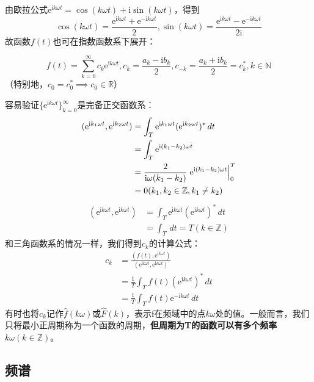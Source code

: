 由欧拉公式$\mathrm{e}^{\mathrm{i}k\omega t}=\cos(k\omega t)+\mathrm{i}\sin(k\omega t)$，得到
\[\cos(k\omega t)=\frac{\mathrm{e}^{\mathrm{i}k\omega t}+\mathrm{e}^{-\mathrm{i}k\omega t}}{2},\sin(k\omega t)=\frac{\mathrm{e}^{\mathrm{i}k\omega t}-\mathrm{e}^{-\mathrm{i}k\omega t}}{2\mathrm{i}}\]
故函数$f(t)$也可在指数函数系下展开：\begin{definition}[指数形式傅里叶展开]
    \[f(t)=\sum_{k = 0}^{\infty}  c_k \mathrm{e}^{\mathrm{i}k\omega t} ,c_k=\frac{a_k-\mathrm{i}b_k}{2},c_{-k}=\frac{a_k+\mathrm{i}b_k}{2}=c_k^*,k\in \mathbb{N}\]
（特别地，$c_0=c_0^*\implies c_0\in\mathbb{R} $）
\end{definition}
容易验证$\{\mathrm{e}^{\mathrm{i}k\omega t}\}_{k=0}^{\infty}$是完备正交函数系：
\begin{align*}
    (\mathrm{e}^{\mathrm{i}k_1\omega t},\mathrm{e}^{\mathrm{i}k_2\omega t})&=\int_{T}\mathrm{e}^{\mathrm{i}k_1\omega t}(\mathrm{e}^{\mathrm{i}k_2\omega t})^*\,dt\\
    &=\int_{T}\mathrm{e}^{\mathrm{i}(k_1-k_2)\omega t}\\
    &=\frac{2}{\mathrm{i}\omega (k_1-k_2)}\left.\mathrm{e}^{\mathrm{i}(k_1-k_2)\omega t}\right|_{0}^{T}\\
    &=0(k_1,k_2\in \mathbb{Z},k_1\neq k_2)
\end{align*}
\begin{align*}
    (\mathrm{e}^{\mathrm{i}k\omega t},\mathrm{e}^{\mathrm{i}k\omega t})&=\int_{T}\mathrm{e}^{\mathrm{i}k\omega t}(\mathrm{e}^{\mathrm{i}k\omega t})^*\,dt\\
    &=\int_{T}\,dt=T(k\in \mathbb{Z} )
\end{align*}
和三角函数系的情况一样，我们得到$c_k$的计算公式：
\begin{align*}
    c_k & =\frac{(f(t),\mathrm{e}^{\mathrm{i}k\omega t})}{(\mathrm{e}^{\mathrm{i}k\omega t},\mathrm{e}^{\mathrm{i}k\omega t})} \\
        & =\frac{1}{T}\int_{T}f(t)(\mathrm{e}^{\mathrm{i}k\omega t})^*\,dt                 \\
        & =\frac{1}{T}\int_{T}f(t)\mathrm{e}^{-\mathrm{i}k\omega t}\,dt
\end{align*}
有时也将$c_k$记作$\hat{f}(k\omega)$或$\hat{F}(k)$，表示f在频域中的点$k\omega$处的值。一般而言，我们只将最小正周期称为一个函数的周期，\textbf{但周期为T的函数可以有多个频率$k\omega(k \in \mathbb{Z})$}。

\subsection{频谱}\label{sub:spectrum}


